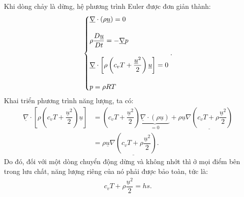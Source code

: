\documentclass[../../../main.tex]{subfiles}
\begin{document}
Khi dòng chảy là dừng, hệ phương trình Euler được đơn giản thành:
	\begin{equation}
		\begin{dcases}
				\underline{\nabla}\cdot\left(\rho \underline{u}\right)=0\\[10pt]
				\rho\dfrac{D\underline{u}}{Dt}=-\underline{\nabla}p\\[10pt]
				\underline{\nabla}\cdot\left[\rho\left(c_vT+\dfrac{\underline{u}^2}{2}\right)\underline{u} \right]=0\\[10pt]
				p=\rho RT
		\end{dcases}.
	\end{equation}
Khai triển phương trình năng lượng, ta có:
	\[
		\begin{aligned}
			\underline{\nabla}\cdot\left[\rho\left(c_vT+\dfrac{\underline{u}^2}{2}\right)\underline{u}\right]&=\left(c_vT+\dfrac{\underline{u}^2}{2}\right)\underbrace{\underline{\nabla}\cdot\left(\rho\underline{u}\right)}_{=0}+\rho\underline{u}\underline{\nabla\left(c_vT+\rho\dfrac{\underline{u}^2}{2}\right)}\\
			&=\rho\underline{u}\underline{\nabla\left(c_vT+\rho\dfrac{\underline{u}^2}{2}\right)}.
		\end{aligned}
	\]
Do đó, đối với một dòng chuyển động dừng và không nhớt thì ở mọi điểm bên trong lưu chất, năng lượng riêng của nó phải được bảo toàn, tức là:
	\begin{align}
		\boxed{c_vT+\rho\dfrac{\underline{u}^2}{2}=hs}.
	\end{align}
\end{document}
